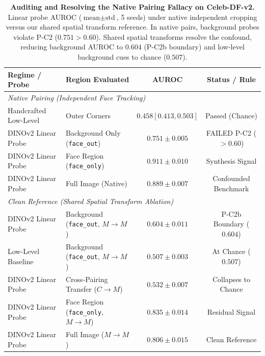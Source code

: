 \begin{table}[t]
\centering
\small
\caption{\textbf{Auditing and Resolving the Native Pairing Fallacy on Celeb-DF-v2.} Linear probe AUROC ($\text{mean} \pm \text{std}$, 5 seeds) under native independent cropping versus our shared spatial transform reference. In native pairs, background probes violate P-C2 ($0.751 > 0.60$). Shared spatial transforms resolve the confound, reducing background AUROC to $0.604$ (P-C2b boundary) and low-level background cues to chance ($0.507$).}
\label{tab:celeb_audit}
\begin{tabular}{llcc}
\toprule
\textbf{Regime / Probe} & \textbf{Region Evaluated} & \textbf{AUROC} & \textbf{Status / Rule} \\
\midrule
\multicolumn{4}{l}{\textit{Native Pairing (Independent Face Tracking)}} \\
Handcrafted Low-Level & Outer Corners & $0.458 [0.413, 0.503]$ & Passed (Chance) \\
DINOv2 Linear Probe & Background Only (\texttt{face\_out}) & $0.751 \pm 0.005$ & FAILED P-C2 ($>0.60$) \\
DINOv2 Linear Probe & Face Region (\texttt{face\_only}) & $0.911 \pm 0.010$ & Synthesis Signal \\
DINOv2 Linear Probe & Full Image (Native) & $0.889 \pm 0.007$ & Confounded Benchmark \\
\midrule
\multicolumn{4}{l}{\textit{Clean Reference (Shared Spatial Transform Ablation)}} \\
DINOv2 Linear Probe & Background (\texttt{face\_out}, $M\to M$) & $0.604 \pm 0.011$ & P-C2b Boundary ($0.604$) \\
Low-Level Baseline & Background (\texttt{face\_out}, $M\to M$) & $0.507 \pm 0.003$ & At Chance ($0.507$) \\
DINOv2 Linear Probe & Cross-Pairing Transfer ($C\to M$) & $0.532 \pm 0.007$ & Collapses to Chance \\
DINOv2 Linear Probe & Face Region (\texttt{face\_only}, $M\to M$) & $0.835 \pm 0.014$ & Residual Signal \\
DINOv2 Linear Probe & Full Image ($M\to M$) & $0.806 \pm 0.015$ & Clean Reference \\
\bottomrule
\end{tabular}
\end{table}


